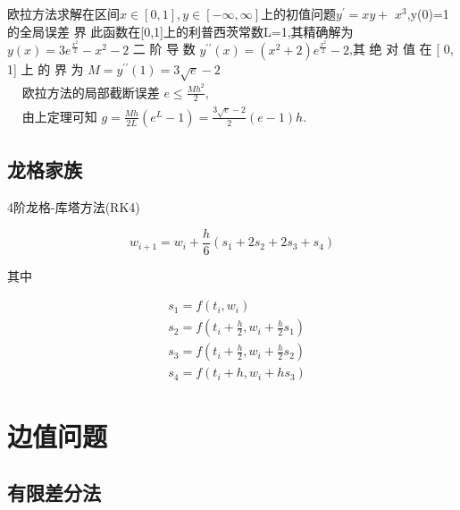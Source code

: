 \documentclass[UTF8,5pt,a4paper]{ctexart} %
\begin{document}
\begin{multicols}{4}
欧拉方法求解在区间$x\in[0,1],y\in[-\infty,\infty]$上的初值问题$y^\prime=xy+$
$x^3$,y(0)=1的全局误差 界
此函数在[0,1]上的利普西茨常数L=1,其精确解为$y(x)=3e^\frac{x^2}2-x^2-2$
二 阶 导 数 $y^{\prime \prime }( x) = ( x^2+ 2) e^{\frac {x^2}2}- 2$,其 绝 对 值 在 [ 0, 1] 上 的 界 为 $M= y^{\prime \prime }( 1) =3\sqrt{e}-2$
$\begin{aligned}
    & \text{欧拉方法的局部截断误差 } e \leq \frac{Mh^2}{2}, \\
    & \text{由上定理可知 } g = \frac{Mh}{2L}(e^L - 1) = \frac{3\sqrt{e} - 2}{2}(e - 1)h.
    \end{aligned}$

\subsection{龙格家族}


4阶龙格-库塔方法(RK4)

$$w_{i+1}=w_{i}+\frac{h}{6}\left(s_{1}+2s_{2}+2s_{3}+s_{4}\right)$$

其中

$$\begin{aligned}&s_{1}=f\left(t_{i},w_{i}\right)\\&s_{2}=f\left(t_{i}+\frac{h}{2},w_{i}+\frac{h}{2}s_{1}\right)\\&s_{3}=f\left(t_{i}+\frac{h}{2},w_{i}+\frac{h}{2}s_{2}\right)\\&s_{4}=f\left(t_{i}+h,w_{i}+hs_{3}\right)\end{aligned}$$


\section{边值问题}
\subsection{有限差分法}


\end{multicols}
\end{document}
